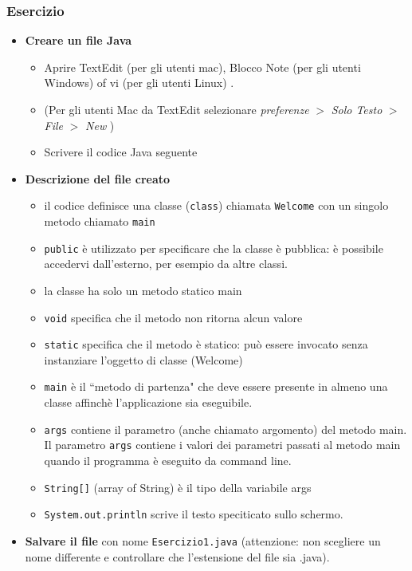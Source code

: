 \documentclass{article}
\theoremstyle{definition}
\begin{document}
\subsubsection{Esercizio}

\begin{itemize}
\item \textbf{Creare un file Java}
\begin{itemize}
\item Aprire  TextEdit (per gli utenti mac), Blocco Note (per gli utenti Windows) of vi (per gli utenti Linux) .
\item (Per gli utenti Mac da TextEdit selezionare \textit{preferenze} $>$ \textit{Solo Testo} $>$ \textit{File} $>$ \textit{New} )
\item Scrivere il codice  Java seguente
\end{itemize}
\end{itemize}

\begin{itemize}
\item \textbf{Descrizione del file creato}
\begin{itemize}
\item il codice definisce una classe (\texttt{class}) chiamata  \texttt{Welcome} con un singolo metodo  chiamato \texttt{main}
\item \texttt{public} \`e utilizzato per specificare che la classe \`e pubblica: \`e possibile accedervi dall'esterno, per esempio da altre classi.
\item la classe ha solo un metodo statico main
\item \texttt{void} specifica che il metodo non ritorna alcun valore
\item \texttt{static} specifica che il metodo \`e statico: pu\`o essere invocato senza instanziare l'oggetto di classe  (Welcome)
\item \texttt{main} \`e il ``metodo di partenza" che deve essere presente in almeno una classe affinch\`e l'applicazione sia eseguibile. 
\item \texttt{args} contiene il parametro (anche chiamato argomento) del metodo main. Il parametro \texttt{args} contiene i valori dei parametri passati al metodo main quando il programma \`e eseguito da command line.
\item \texttt{String[]} (array of String) \`e il tipo della variabile args 
\item \texttt{System.out.println} scrive il testo speciticato sullo schermo.
\end{itemize}
\end{itemize}
\begin{itemize}
\item \textbf{Salvare il file} con nome \texttt{Esercizio1.java} (attenzione: non scegliere un nome differente e controllare che l'estensione del file sia .java).
\end{itemize}
\end{document}
